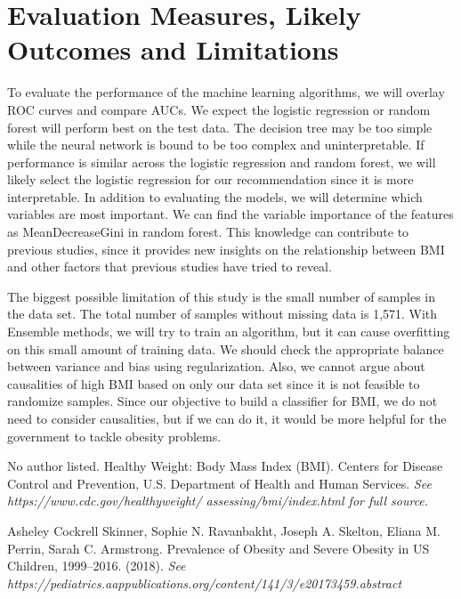 \documentclass[twoside,11pt]{article}
\begin{document}
\section{Evaluation Measures, Likely Outcomes and Limitations}
To evaluate the performance of the machine learning algorithms, we will overlay ROC curves and compare AUCs. We expect the logistic regression or random forest will perform best on the test data. The decision tree may be too simple while the neural network is bound to be too complex and uninterpretable. If performance is similar across the logistic regression and random forest, we will likely select the logistic regression for our recommendation since it is more interpretable. In addition to evaluating the models, we will determine which variables are most important. We can find the variable importance of the features as MeanDecreaseGini in random forest. This knowledge can contribute to previous studies, since it provides new insights on the relationship between BMI and other factors that previous studies have tried to reveal.

The biggest possible limitation of this study is the small number of samples in the data set. The total number of samples without missing data is 1,571. With Ensemble methods, we will try to train an algorithm, but it can cause overfitting on this small amount of training data. We should check the appropriate balance between variance and bias using regularization. Also, we cannot argue about causalities of high BMI based on only our data set since it is not feasible to randomize samples. Since our objective to build a classifier for BMI, we do not need to consider causalities, but if we can do it, it would be more helpful for the government to tackle obesity problems.


No author listed. Healthy Weight: Body Mass Index (BMI). Centers for Disease Control and Prevention, U.S. Department of Health and Human Services.
 {\noindent \em See https://www.cdc.gov/healthyweight/
 assessing/bmi/index.html for full source.}

Asheley Cockrell Skinner, Sophie N. Ravanbakht, Joseph A. Skelton, Eliana M. Perrin, Sarah C. Armstrong. Prevalence of Obesity and Severe Obesity in US Children, 1999–2016. (2018).
{\noindent \em See https://pediatrics.aappublications.org/content/141/3/e20173459.abstract}
\end{document}
